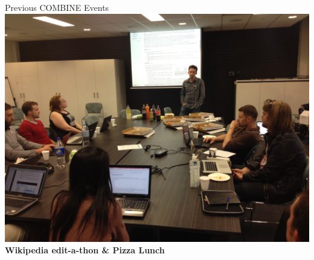 \documentclass[svgnames]{beamer}
\begin{document}
\begin{frame}{Previous COMBINE Events}
    \centering
    \vfill
    \includegraphics[width=0.9\linewidth]{./images/wikipedia-editathon-photo.jpg}\\
    \textbf{Wikipedia edit-a-thon \& Pizza Lunch}\\
\end{frame}
\end{document}
